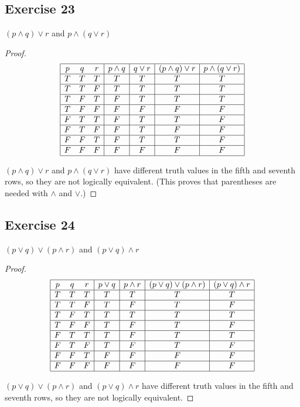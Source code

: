 \documentclass[14pt]{extarticle}
\begin{document}
\subsection{Exercise 23} 
$(p \wedge q) \vee r$ and $p \wedge (q \vee r)$

\begin{proof} 
$$ 
\begin{array}{|ccc|c|c|c|c|} 
\hline 
p & q & r & p \wedge q & q \vee r & (p \wedge q) \vee r & p \wedge (q \vee r) \\
\hline 
T & T & T & T & T & T & T \\ 
\hline 
T & T & F & T & T & T & T \\ 
\hline 
T & F & T & F & T & T & T \\
\hline 
T & F & F & F & F & F & F \\ 
\hline 
F & T & T & F & T & T & F \\ 
\hline 
F & T & F & F & T & F & F \\ 
\hline 
F & F & T & F & T & T & F \\ 
\hline 
F & F & F & F & F & F & F \\ 
\hline 
\end{array} 
$$

$(p \wedge q) \vee r$ and $p \wedge (q \vee r)$ have different truth values in the fifth and seventh rows, so they are not logically equivalent. (This proves that parentheses are needed with $\wedge$ and $\vee$.) 
\end{proof}

\subsection{Exercise 24} 
$(p \vee q) \vee (p \wedge r)$ and $(p \vee q) \wedge r$

\begin{proof} 
$$ 
\begin{array}{|ccc|c|c|c|c|} 
\hline 
p & q & r & p \vee q & p \wedge r & (p \vee q) \vee (p \wedge r) & (p \vee q) \wedge r \\ 
\hline 
T & T & T & T & T & T & T \\ 
\hline 
T & T & F & T & F & T & F \\ 
\hline
T & F & T & T & T & T & T \\ 
\hline 
T & F & F & T & F & T & F \\ 
\hline 
F & T & T & T & F & T & T \\ 
\hline 
F & T & F & T & F & T & F \\ 
\hline 
F & F & T & F & F & F & F \\
\hline 
F & F & F & F & F & F & F \\ 
\hline 
\end{array} 
$$

$(p \vee q) \vee (p \wedge r)$ and $(p \vee q) \wedge r$ have different truth values in the fifth and seventh rows, so they are not logically equivalent.
\end{proof}
\end{document}
